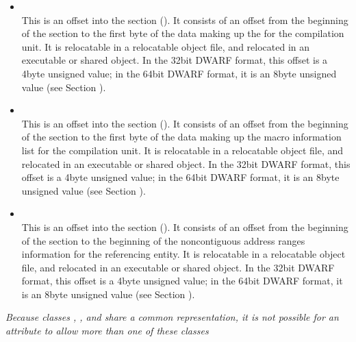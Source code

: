 \begin{itemize}
\item {} \\
This is an offset into the 
section
(). 
It consists of an offset from the
beginning of the 
section to the first byte of
the data making up the 
 for the compilation
unit. 
It is relocatable in a relocatable object file, and
relocated in an executable or shared object. In the 32\dash bit
DWARF format, this offset is a 4\dash byte unsigned value;
in the 64\dash bit DWARF format, it is an 8\dash byte unsigned value
(see Section ).


\item {} \\
This is an 
offset into the 
 section
(). 
It consists of an offset from the
beginning of the  
section to the first byte of
the data making up the macro information list for the compilation
unit. 
It is relocatable in a relocatable object file, and
relocated in an executable or shared object. In the 32\dash bit
DWARF format, this offset is a 4\dash byte unsigned value;
in the 64\dash bit DWARF format, it is an 8\dash byte unsigned value
(see Section ).

\item {} \\
This is an 
offset into the  section
(). 
It consists of an
offset from the beginning of the 
 section
to the beginning of the non\dash contiguous address ranges
information for the referencing entity.  
It is relocatable in
a relocatable object file, and relocated in an executable or
shared object. In the 32\dash bit DWARF format, this offset
is a 4\dash byte unsigned value; in the 64\dash bit DWARF
format, it is an 8\dash byte unsigned value (see Section
).
\end{itemize}

\textit{Because classes , 
, 
 and 
share a common representation, it is not possible for an
attribute to allow more than one of these classes}


